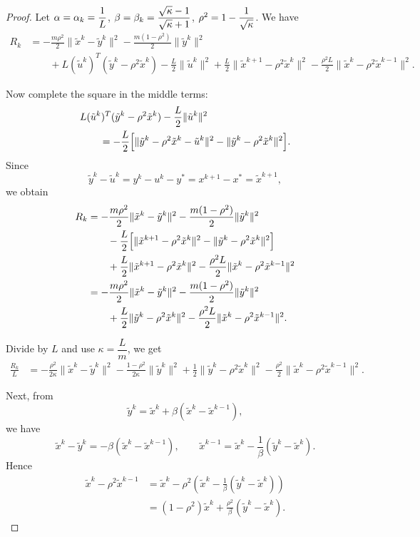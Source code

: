 \begin{proof}
Let $\alpha=\alpha_k=\dfrac{1}{L}$, $\beta=\beta_k=\dfrac{\sqrt{\kappa}-1}{\sqrt{\kappa}+1}$, $\rho^2=1-\dfrac{1}{\sqrt{\kappa}}$. 
We have
\begin{align*}
R_k
&=
-\frac{m\rho^2}{2}\|\tilde x^k-\tilde y^k\|^2
-\frac{m(1-\rho^2)}{2}\|\tilde y^k\|^2 \\
&\qquad
+L(\tilde u^k)^T(\tilde y^k-\rho^2\tilde x^k)
-\frac{L}{2}\|\tilde u^k\|^2
+\frac{L}{2}\|\tilde x^{k+1}-\rho^2\tilde x^k\|^2
-\frac{\rho^2L}{2}\|\tilde x^k-\rho^2\tilde x^{k-1}\|^2.
\end{align*}

Now complete the square in the middle terms:
\begin{align*}
&L(\tilde u^k)^T(\tilde y^k-\rho^2\tilde x^k)-\frac{L}{2}\|\tilde u^k\|^2 \\
&\qquad
=
-\frac{L}{2}\Bigl[
\|\tilde y^k-\rho^2\tilde x^k-\tilde u^k\|^2
-\|\tilde y^k-\rho^2\tilde x^k\|^2
\Bigr].
\end{align*}
Since
\[
\tilde y^k-\tilde u^k
=
y^k-u^k-y^*
=
x^{k+1}-x^*
=
\tilde x^{k+1},
\]
we obtain
\begin{align*}
R_k
&=
-\frac{m\rho^2}{2}\|\tilde x^k-\tilde y^k\|^2
-\frac{m(1-\rho^2)}{2}\|\tilde y^k\|^2 \\
&\qquad
-\frac{L}{2}\Bigl[
\|\tilde x^{k+1}-\rho^2\tilde x^k\|^2
-\|\tilde y^k-\rho^2\tilde x^k\|^2
\Bigr] \\
&\qquad
+\frac{L}{2}\|\tilde x^{k+1}-\rho^2\tilde x^k\|^2
-\frac{\rho^2L}{2}\|\tilde x^k-\rho^2\tilde x^{k-1}\|^2 \\
&=
-\frac{m\rho^2}{2}\|\tilde x^k-\tilde y^k\|^2
-\frac{m(1-\rho^2)}{2}\|\tilde y^k\|^2 \\
&\qquad
+\frac{L}{2}\|\tilde y^k-\rho^2\tilde x^k\|^2
-\frac{\rho^2L}{2}\|\tilde x^k-\rho^2\tilde x^{k-1}\|^2.
\end{align*}

Divide by $L$ and use $\kappa=\dfrac{L}{m}$, we get
\begin{align*}
\frac{R_k}{L}
&=
-\frac{\rho^2}{2\kappa}\|\tilde x^k-\tilde y^k\|^2
-\frac{1-\rho^2}{2\kappa}\|\tilde y^k\|^2
+\frac12\|\tilde y^k-\rho^2\tilde x^k\|^2
-\frac{\rho^2}{2}\|\tilde x^k-\rho^2\tilde x^{k-1}\|^2.
\end{align*}

Next, from
\[
\tilde y^k=\tilde x^k+\beta(\tilde x^k-\tilde x^{k-1}),
\]
we have
\[
\tilde x^k-\tilde y^k=-\beta(\tilde x^k-\tilde x^{k-1}),
\qquad
\tilde x^{k-1}
=
\tilde x^k-\frac{1}{\beta}(\tilde y^k-\tilde x^k).
\]
Hence
\begin{align*}
\tilde x^k-\rho^2\tilde x^{k-1}
&=
\tilde x^k-\rho^2\left(\tilde x^k-\frac{1}{\beta}(\tilde y^k-\tilde x^k)\right) \\
&=
(1-\rho^2)\tilde x^k+\frac{\rho^2}{\beta}(\tilde y^k-\tilde x^k).
\end{align*}


\end{proof}
